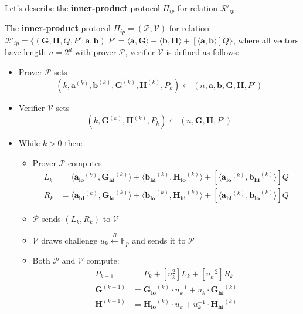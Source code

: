 \documentclass[../lecture-notes-148x210.tex]{subfiles}
\begin{document}
Let's describe the \textbf{inner-product} protocol $\Pi_{ip}$ for relation $\mathcal{R}'_{ip}$. 
\begin{definition}
    The \textbf{inner-product} protocol $\Pi_{ip} = (\mathcal{P}, \mathcal{V})$ for relation $\mathcal{R}'_{ip} = \{ (\mathbf{G,H}, Q, P'; \mathbf{a,b}) \vert P' = \langle \mathbf{a,G} \rangle + \langle \mathbf{b,H} \rangle + [\langle \mathbf{a,b} \rangle]Q \}$, where all vectors have length $n=2^d$ with prover $\mathcal{P}$, verifier $\mathcal{V}$ is defined as follows:
    \begin{itemize}
        \item Prover $\mathcal{P}$ sets $$(k, \mathbf{a}^{(k)}, \mathbf{b}^{(k)}, \mathbf{G}^{(k)}, \mathbf{H}^{(k)}, P_k) \gets (n, \mathbf{a,b,G,H},P')$$
        \item Verifier $\mathcal{V}$ sets $$(k, \mathbf{G}^{(k)}, \mathbf{H}^{(k)}, P_k) \gets (n, \mathbf{G,H},P')$$
        \item While $k > 0$ then:
            \begin{itemize}
                \item Prover $\mathcal{P}$ computes 
                    \begin{align*}
                        L_{k} &= \langle \mathbf{a_{lo}}^{(k)}, \mathbf{G_{hi}}^{(k)}\rangle + \langle \mathbf{b_{hi}}^{(k)}, \mathbf{H_{lo}}^{(k)}\rangle + [\langle \mathbf{a_{lo}}^{(k)}, \mathbf{b_{hi}}^{(k)}\rangle]Q \\
                        R_{k} &= \langle \mathbf{a_{hi}}^{(k)}, \mathbf{G_{lo}}^{(k)}\rangle + \langle \mathbf{b_{lo}}^{(k)}, \mathbf{H_{hi}}^{(k)}\rangle + [\langle \mathbf{a_{hi}}^{(k)}, \mathbf{b_{lo}}^{(k)}\rangle]Q
                    \end{align*}
                \item $\mathcal{P}$ sends $(L_k, R_k)$ to $\mathcal{V}$
                \item $\mathcal{V}$ draws challenge $u_k \xleftarrow{R} \mathbb{F}_p$ and sends it to $\mathcal{P}$
                \item Both $\mathcal{P}$ and $\mathcal{V}$ compute:
                    \begin{align*}
                        P_{k-1} &= P_k + [u_k^2] L_k + [u_k^{-2}] R_k \\
                        \mathbf{G}^{(k-1)} &= \mathbf{G_{lo}}^{(k)} \cdot u_k^{-1} + u_k \cdot \mathbf{G_{hi}}^{(k)} \\
                        \mathbf{H}^{(k-1)} &= \mathbf{H_{lo}}^{(k)} \cdot u_k + u_k^{-1} \cdot \mathbf{H_{hi}}^{(k)}

\end{align*}
\end{itemize}
\end{itemize}
\end{definition}
\end{document}

